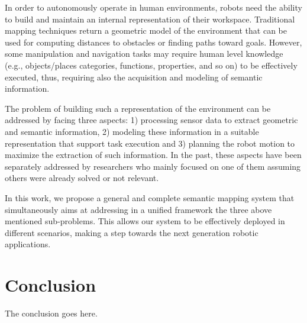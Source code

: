 \documentclass[conference]{IEEEtran}
\begin{document}
In order to autonomously operate in human environments, robots need
the ability to build and maintain an internal representation of their
workspace. Traditional mapping techniques return a geometric model of
the environment that can be used for computing distances to obstacles
or finding paths toward goals. However, some manipulation and
navigation tasks may require human level knowledge (e.g.,
objects/places categories, functions, properties, and so on) to be
effectively executed, thus, requiring also the acquisition and
modeling of semantic information.

The problem of building such a representation of the environment can
be addressed by facing three aspects: 1) processing sensor data to
extract geometric and semantic information, 2) modeling these
information in a suitable representation that support task execution
and 3) planning the robot motion to maximize the extraction of such
information. In the past, these aspects have been separately addressed
by researchers who mainly focused on one of them assuming others were
already solved or not relevant.

In this work, we propose a general and complete semantic mapping
system that simultaneously aims at addressing in a unified framework
the three above mentioned sub-problems. This allows our system to be
effectively deployed in different scenarios, making a step towards the
next generation robotic applications.


\section{Conclusion}
The conclusion goes here.



%
%
%







\end{document}
